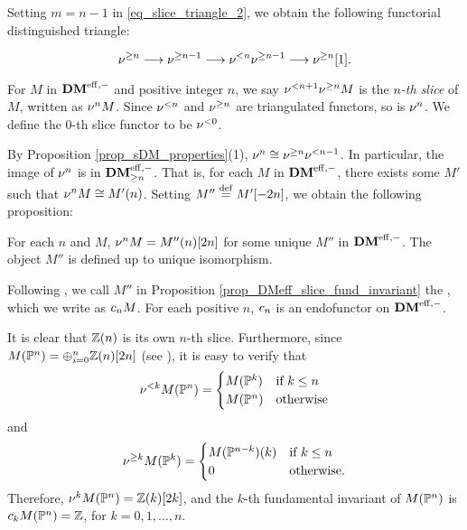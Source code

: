 Setting $m = n - 1$ in \eqref{eq_slice_triangle_2}, we obtain the
following functorial distinguished triangle:

\begin{equation}\label{eq_slice_triangle_3}
\sgDM{n} \to \sgDM{n - 1} \to \slDM{n} \sgDM{n - 1}
\to \sgDM{n}[1].
\end{equation}

\begin{defn}\label{def_slice_functors_DMeff}
For $M$ in $\DMeff$ and positive integer $n$, we say 
$\slDM{n+1}\sgDM{n}M$ is the \emph{$n$-th slice} of $M$, written 
as $\sliceDM{n}M$. Since $\slDM{n}$ and $\sgDM{n}$ are 
triangulated functors, so is $\sliceDM{n}$. We define the $0$-th
slice functor to be $\slDM{0}$.
\end{defn}

By Proposition \ref{prop_sDM_properties}(1), $\sliceDM{n} \cong
\sgDM{n}\slDM{n - 1}$. In particular, the image of
$\sliceDM{n}$ is in $\GFiltDM[n]{\DMeff}$. That is, for each $M$ in 
$\DMeff$, there exists some $M'$ such that $\sliceDM{n}M \cong 
\tZ[n]{M'}$. Setting $M'' \defeq M'[-2n]$, we obtain the following 
proposition:

\begin{prop}
\label{prop_DMeff_slice_fund_invariant}
For each $n$ and $M$, $\sliceDM{n}M = \tZ[n]{M''}[2n]$ for some 
unique $M''$ in $\DMeff$. The object $M''$ is defined up to
unique isomorphism.
\end{prop}

\begin{defn}\label{def_DM_fund_invariant}
Following \loccit, we call $M''$ in Proposition
\ref{prop_DMeff_slice_fund_invariant} the , which we write as $\fIDM{n}M$. For each positive 
$n$, $\fIDM{n}$ is an endofunctor on $\DMeff$.
\end{defn}

\begin{ex}\label{ex_sfilt_MPn}
It is clear that $\Z(n)$ is its own $n$-th slice. Furthermore,
since $M(\P^n) = \oplus_{i = 0}^n \Z(n)[2n]$ (see 
\cite[15.5]{MVW}), it is easy to verify that 
\[
\slDM{k}M(\P^n) = \begin{cases}
M(\P^k) & \textrm{if }k \leq n \\
M(\P^n) & \textrm{otherwise}
\end{cases}
\]
and 
\[
\sgDM{k}M(\P^k) = \begin{cases}
\tZ[k]{M(\P^{n - k})} & \textrm{if }k \leq n\\
0 & \textrm{otherwise}.
\end{cases}
\]
Therefore, $\sliceDM{k} M(\P^n) = \Z(k)[2k]$, and the $k$-th
fundamental invariant of $M(\P^n)$ is $\fIDM{k}M(\P^n) = \Z$,
for $k = 0,1,\dots,n$.
\end{ex}

